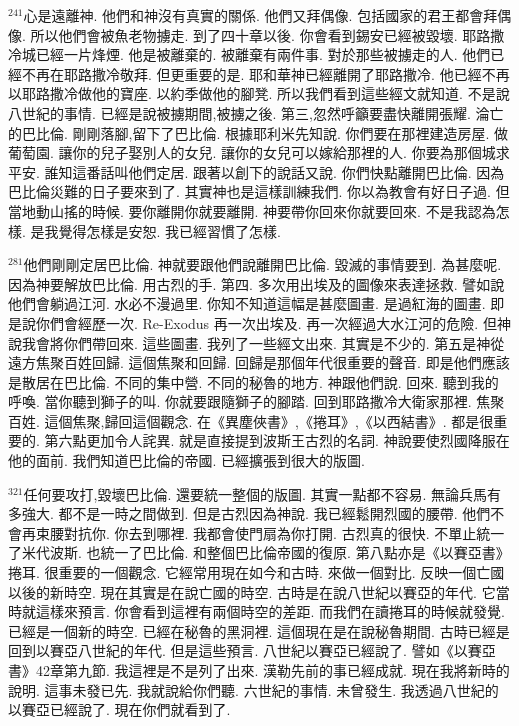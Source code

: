 \documentclass{book}
\begin{document}
$^{241}$心是遠離神.
他們和神沒有真實的關係.
他們又拜偶像.
包括國家的君王都會拜偶像.
所以他們會被魚老物擄走.
到了四十章以後.
你會看到錫安已經被毀壞.
耶路撒冷城已經一片烽煙.
他是被離棄的.
被離棄有兩件事.
對於那些被擄走的人.
他們已經不再在耶路撒冷敬拜.
但更重要的是.
耶和華神已經離開了耶路撒冷.
他已經不再以耶路撒冷做他的寶座.
以約季做他的腳凳.
所以我們看到這些經文就知道.
不是說八世紀的事情.
已經是說被擄期間,被擄之後.
第三,忽然呼籲要盡快離開張耀.
淪亡的巴比倫.
剛剛落腳,留下了巴比倫.
根據耶利米先知說.
你們要在那裡建造房屋.
做葡萄園.
讓你的兒子娶別人的女兒.
讓你的女兒可以嫁給那裡的人.
你要為那個城求平安.
誰知這番話叫他們定居.
跟著以創下的說話又說.
你們快點離開巴比倫.
因為巴比倫災難的日子要來到了.
其實神也是這樣訓練我們.
你以為教會有好日子過.
但當地動山搖的時候.
要你離開你就要離開.
神要帶你回來你就要回來.
不是我認為怎樣.
是我覺得怎樣是安恕.
我已經習慣了怎樣.

$^{281}$他們剛剛定居巴比倫.
神就要跟他們說離開巴比倫.
毀滅的事情要到.
為甚麼呢.
因為神要解放巴比倫.
用古烈的手.
第四.
多次用出埃及的圖像來表達拯救.
譬如說他們會躺過江河.
水必不漫過里.
你知不知道這幅是甚麼圖畫.
是過紅海的圖畫.
即是說你們會經歷一次.
Re-Exodus 再一次出埃及.
再一次經過大水江河的危險.
但神說我會將你們帶回來.
這些圖畫.
我列了一些經文出來.
其實是不少的.
第五是神從遠方焦聚百姓回歸.
這個焦聚和回歸.
回歸是那個年代很重要的聲音.
即是他們應該是散居在巴比倫.
不同的集中營.
不同的秘魯的地方.
神跟他們說.
回來.
聽到我的呼喚.
當你聽到獅子的叫.
你就要跟隨獅子的腳踏.
回到耶路撒冷大衛家那裡.
焦聚百姓.
這個焦聚,歸回這個觀念.
在《異塵俠書》,《捲耳》,《以西結書》.
都是很重要的.
第六點更加令人詫異.
就是直接提到波斯王古烈的名詞.
神說要使烈國降服在他的面前.
我們知道巴比倫的帝國.
已經擴張到很大的版圖.

$^{321}$任何要攻打,毀壞巴比倫.
還要統一整個的版圖.
其實一點都不容易.
無論兵馬有多強大.
都不是一時之間做到.
但是古烈因為神說.
我已經鬆開烈國的腰帶.
他們不會再束腰對抗你.
你去到哪裡.
我都會使門扇為你打開.
古烈真的很快.
不單止統一了米代波斯.
也統一了巴比倫.
和整個巴比倫帝國的復原.
第八點亦是《以賽亞書》捲耳.
很重要的一個觀念.
它經常用現在如今和古時.
來做一個對比.
反映一個亡國以後的新時空.
現在其實是在說亡國的時空.
古時是在說八世紀以賽亞的年代.
它當時就這樣來預言.
你會看到這裡有兩個時空的差距.
而我們在讀捲耳的時候就發覺.
已經是一個新的時空.
已經在秘魯的黑洞裡.
這個現在是在說秘魯期間.
古時已經是回到以賽亞八世紀的年代.
但是這些預言.
八世紀以賽亞已經說了.
譬如《以賽亞書》42章第九節.
我這裡是不是列了出來.
漢勒先前的事已經成就.
現在我將新時的說明.
這事未發已先.
我就說給你們聽.
六世紀的事情.
未曾發生.
我透過八世紀的以賽亞已經說了.
現在你們就看到了.
\end{document}
